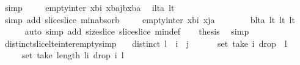 \begin{isabellebody}
\ simp\isanewline
\ \ \isamarkupfalse%
\ {}{\isacharcolon}\ {\isachardoublequoteopen}empty{\isacharunderscore}inter\ {\isacharparenleft}x{\isasymdagger}b{\isachardot}{\isachardot}i{\isacharparenright}\ {\isacharparenleft}{\isacharparenleft}x{\isasymdagger}b{\isachardot}{\isachardot}a{\isacharparenright}{\isasymdagger}{\isacharparenleft}j{\isacharminus}b{\isacharparenright}{\isachardot}{\isachardot}{\isacharparenleft}{\isacharhash}{\isacharparenleft}x{\isasymdagger}b{\isachardot}{\isachardot}a{\isacharparenright}{\isacharparenright}{\isacharparenright}{\isachardoublequoteclose}\ \isamarkupfalse%
\ ilta\ lt{}\isanewline
\ \ \ \ \isamarkupfalse%
\ {\isacharparenleft}simp\ add{\isacharcolon}\ slice{\isacharunderscore}slice\ min{\isacharunderscore}absorb{}{\isacharparenright}\isanewline
\ \ \isamarkupfalse%
\ {}{\isacharcolon}\ {\isachardoublequoteopen}empty{\isacharunderscore}inter\ {\isacharparenleft}x{\isasymdagger}b{\isachardot}{\isachardot}i{\isacharparenright}\ {\isacharparenleft}x{\isasymdagger}j{\isachardot}{\isachardot}a{\isacharparenright}{\isachardoublequoteclose}\ \ \isanewline
\ \ \ \ \isamarkupfalse%
\ blta\ lt{}\ lt{}\ lt{}\ \isanewline
\ \ \ \ \isamarkupfalse%
\ {\isacharparenleft}auto\ simp\ add{\isacharcolon}\ size{\isacharunderscore}slice\ slice{\isacharunderscore}slice\ min{\isacharunderscore}def{\isacharparenright}\isanewline
\ \ \isamarkupfalse%
\ {\isacharquery}thesis\ \isamarkupfalse%
\ simp\isanewline
{}\isamarkupfalse%
%
\endisatagproof
{\isafoldproof}%
%
\isadelimproof
\isanewline
%
\endisadelimproof
\isanewline
{}\isamarkupfalse%
\ distinct{\isacharunderscore}slice{\isacharunderscore}lte{\isacharunderscore}inter{\isacharunderscore}empty{\isacharbrackleft}simp{\isacharbrackright}{\isacharcolon}\ \isanewline
\ \ {\isachardoublequoteopen}distinct\ l\ {\isasymLongrightarrow}\ i\ {\isasymle}\ j\ {\isasymLongrightarrow}\ \isanewline
\ \ \ \ set\ {\isacharparenleft}take\ i\ {\isacharparenleft}drop\ {}\ l{\isacharparenright}{\isacharparenright}\ \isanewline
\ \ \ \ {\isasyminter}\ set\ {\isacharparenleft}take\ {\isacharparenleft}length\ l{\isacharminus}i{\isacharparenright}\ {\isacharparenleft}drop\ i\ l{\isacharparenright}{\isacharparenright}\ {\isacharequal}\ {\isacharbraceleft}{\isacharbraceright}{\isachardoublequoteclose}\isanewline
%
\isadelimproof
%
\endisadelimproof
%
\isatagproof

\end{isabellebody}

